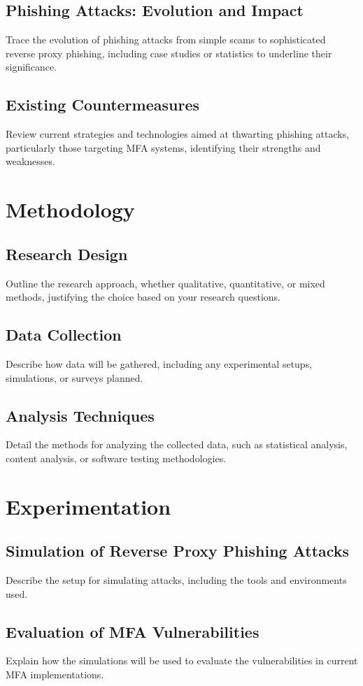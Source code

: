 \documentclass [14pt]{extarticle}
\begin{document}
\subsection{Phishing Attacks: Evolution and Impact}
Trace the evolution of phishing attacks from simple scams to sophisticated reverse proxy phishing, including case studies or statistics to underline their significance.
\subsection{Existing Countermeasures}
Review current strategies and technologies aimed at thwarting phishing attacks, particularly those targeting MFA systems, identifying their strengths and weaknesses.

\section{Methodology}
\subsection{Research Design}
Outline the research approach, whether qualitative, quantitative, or mixed methods, justifying the choice based on your research questions.
\subsection{Data Collection}
Describe how data will be gathered, including any experimental setups, simulations, or surveys planned.
\subsection{Analysis Techniques}
Detail the methods for analyzing the collected data, such as statistical analysis, content analysis, or software testing methodologies.

\section{Experimentation}
\subsection{Simulation of Reverse Proxy Phishing Attacks}
Describe the setup for simulating attacks, including the tools and environments used.
\subsection{Evaluation of MFA Vulnerabilities}
Explain how the simulations will be used to evaluate the vulnerabilities in current MFA implementations.
\end{document}

